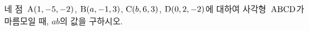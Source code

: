 네 점~$\mathrm{A}(1{,}\mkern3mu\mathopen{}-5{,}\mkern3mu\mathopen{}-2)$, $\mathrm{B}(a{,}\mkern3mu\mathopen{}-1{,}\mkern3mu\mathopen{}3)$, $\mathrm{C}(b{,}\mkern3mu\mathopen{}6{,}\mkern3mu\mathopen{}3)$, $\mathrm{D}(0{,}\mkern3mu\mathopen{}2{,}\mkern3mu\mathopen{}-2)$에 대하여 사각형~$\mathrm{ABCD}$가 마름모일 때, $ab$의 값을 구하시오. 
